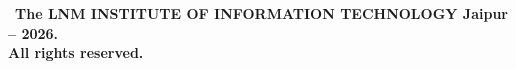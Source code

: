 \thispagestyle{empty}
\vfill
\begin{center}
\vspace*{\fill} \textcopyright\ \textbf{The LNM INSTITUTE OF INFORMATION TECHNOLOGY Jaipur -- 2026.}\\
\textbf{All rights reserved.}
\end{center}
\clearpage